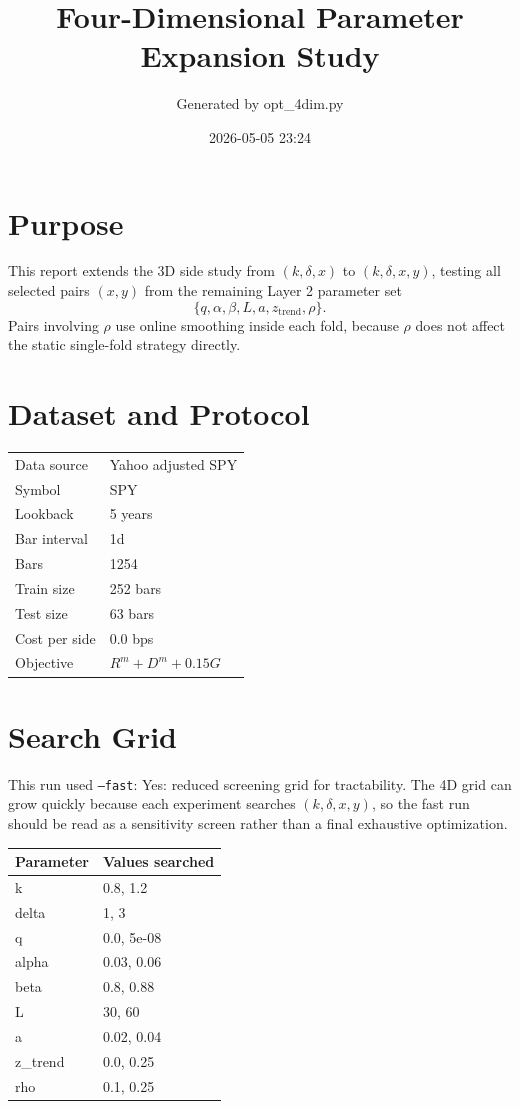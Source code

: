 \documentclass[10pt]{article}
\title{Four-Dimensional Parameter Expansion Study}
\author{Generated by opt\_4dim.py}
\date{2026-05-05 23:24}
\begin{document}
\maketitle

\section*{Purpose}
This report extends the 3D side study from $(k,\delta,x)$ to
$(k,\delta,x,y)$, testing all selected pairs $(x,y)$ from the remaining
Layer 2 parameter set
\[
\{q,\alpha,\beta,L,a,z_{\mathrm{trend}},\rho\}.
\]
Pairs involving $\rho$ use online smoothing inside each fold, because $\rho$
does not affect the static single-fold strategy directly.

\section*{Dataset and Protocol}
\begin{tabular}{ll}
\toprule
Data source & Yahoo adjusted SPY \\
Symbol & SPY \\
Lookback & 5 years \\
Bar interval & 1d \\
Bars & 1254 \\
Train size & 252 bars \\
Test size & 63 bars \\
Cost per side & 0.0 bps \\
Objective & $R^m + D^m + 0.15G$ \\
\bottomrule
\end{tabular}

\section*{Search Grid}
This run used \texttt{--fast}: Yes: reduced screening grid for tractability. The 4D grid
can grow quickly because each experiment searches $(k,\delta,x,y)$, so the
fast run should be read as a sensitivity screen rather than a final exhaustive
optimization.

\begin{tabular}{ll}
\toprule
Parameter & Values searched \\
\midrule
k & 0.8, 1.2 \\
delta & 1, 3 \\
q & 0.0, 5e-08 \\
alpha & 0.03, 0.06 \\
beta & 0.8, 0.88 \\
L & 30, 60 \\
a & 0.02, 0.04 \\
z\_trend & 0.0, 0.25 \\
rho & 0.1, 0.25 \\
\bottomrule
\end{tabular}
\end{document}

